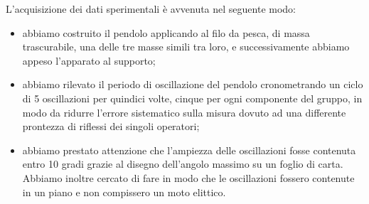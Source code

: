 L'acquisizione dei dati sperimentali è avvenuta nel seguente modo:
\begin{itemize}
	\item{abbiamo costruito il pendolo applicando al filo da pesca, di massa trascurabile, una delle tre masse simili tra loro, e successivamente abbiamo appeso l'apparato al supporto;}
	\item{abbiamo rilevato il periodo di oscillazione del pendolo cronometrando un ciclo di 5 oscillazioni per quindici volte, cinque per ogni componente del gruppo, in modo da ridurre l'errore sistematico sulla misura dovuto ad una differente prontezza di riflessi dei singoli operatori;}
	\item{abbiamo prestato attenzione che l'ampiezza delle oscillazioni fosse contenuta entro 10 gradi grazie al disegno dell'angolo massimo su un foglio di carta. Abbiamo inoltre cercato di fare in modo che le oscillazioni fossero contenute in un piano e non compissero un moto elittico.}
\end{itemize}
